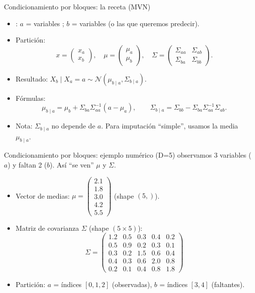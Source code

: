 \begin{frame}{Condicionamiento por bloques: la receta (MVN)}
\begin{itemize}
  \item {}: \(a\) = variables ; \(b\) = variables  (o las que queremos predecir).
  \item Partición:
  \[
    x=\begin{pmatrix}x_a\\x_b\end{pmatrix},\quad
    \mu=\begin{pmatrix}\mu_a\\\mu_b\end{pmatrix},\quad
    \Sigma=\begin{pmatrix}\Sigma_{aa}&\Sigma_{ab}\\ \Sigma_{ba}&\Sigma_{bb}\end{pmatrix}.
  \]
  \item Resultado: \(X_b\mid X_a=a\sim \mathcal{N}(\mu_{b\mid a},\Sigma_{b\mid a})\).
  \item Fórmulas:
  \[
    \mu_{b\mid a}=\mu_b+\Sigma_{ba}\Sigma_{aa}^{-1}(a-\mu_a),
    \qquad
    \Sigma_{b\mid a}=\Sigma_{bb}-\Sigma_{ba}\Sigma_{aa}^{-1}\Sigma_{ab}.
  \]
  \item Nota: \(\Sigma_{b\mid a}\) no depende de \(a\). Para imputación “simple”, usamos la media \(\mu_{b\mid a}\).
\end{itemize}
\end{frame}

\begin{frame}{Condicionamiento por bloques: ejemplo numérico (D=5)}
\small
{} observamos 3 variables (\(a\)) y faltan 2 (\(b\)). Así “se ven” \(\mu\) y \(\Sigma\).
\begin{itemize}\small
  \item Vector de medias: \(\mu=\begin{pmatrix}2.1\\1.8\\3.0\\4.2\\5.5\end{pmatrix}\) (shape \((5,)\)).
  \item Matriz de covarianza \(\Sigma\) (shape \((5\times 5)\)):
  \[
  \Sigma=\begin{pmatrix}
    1.2 & 0.5 & 0.3 & 0.4 & 0.2\\
    0.5 & 0.9 & 0.2 & 0.3 & 0.1\\
    0.3 & 0.2 & 1.5 & 0.6 & 0.4\\
    0.4 & 0.3 & 0.6 & 2.0 & 0.8\\
    0.2 & 0.1 & 0.4 & 0.8 & 1.8
  \end{pmatrix}
  \]
  \item Partición: \(a\) = índices \([0,1,2]\) (observadas), \(b\) = índices \([3,4]\) (faltantes).
\end{itemize}
\end{frame}

